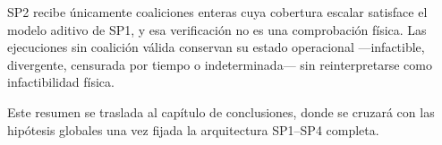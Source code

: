 




SP2 recibe únicamente coaliciones enteras cuya cobertura escalar satisface
el modelo aditivo de SP1, y esa verificación no es una comprobación física. Las
ejecuciones sin coalición válida conservan su estado operacional ---infactible,
divergente, censurada por tiempo o indeterminada--- sin reinterpretarse como
infactibilidad física.






{\footnotesize Este resumen se traslada al capítulo de conclusiones, donde se cruzará con las hipótesis globales una vez fijada la arquitectura SP1--SP4 completa.}

